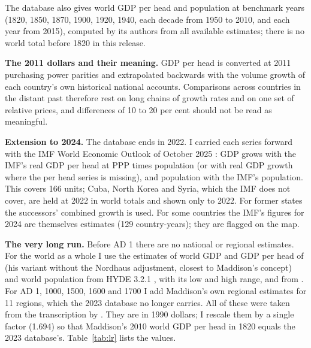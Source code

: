 \documentclass[11pt,a4paper]{article}
\begin{document}
The database also gives world GDP per head and population at benchmark years (1820, 1850, 1870, 1900, 1920, 1940, each decade from 1950 to 2010, and each year from 2015), computed by its authors from all available estimates; there is no world total before 1820 in this release.

\textbf{The 2011 dollars and their meaning.} GDP per head is converted at 2011 purchasing power parities and extrapolated backwards with the volume growth of each country's own historical national accounts. Comparisons across countries in the distant past therefore rest on long chains of growth rates and on one set of relative prices, and differences of 10 to 20 per cent should not be read as meaningful.

\textbf{Extension to 2024.} The database ends in 2022. I carried each series forward with the IMF World Economic Outlook of October 2025 \citep{weo2025}: GDP grows with the IMF's real GDP per head at PPP times population (or with real GDP growth where the per head series is missing), and population with the IMF's population. This covers 166 units; Cuba, North Korea and Syria, which the IMF does not cover, are held at 2022 in world totals and shown only to 2022. For former states the successors' combined growth is used. For some countries the IMF's figures for 2024 are themselves estimates (129 country-years); they are flagged on the map.

\textbf{The very long run.} Before AD 1 there are no national or regional estimates. For the world as a whole I use the estimates of world GDP and GDP per head of \citet{delong1998} (his variant without the Nordhaus adjustment, closest to Maddison's concept) and world population from HYDE 3.2.1 \citep{hyde2017}, with its low and high range, and from \citet{mcevedy1978}. For AD 1, 1000, 1500, 1600 and 1700 I add Maddison's own regional estimates \citep{maddison2010} for 11 regions, which the 2023 database no longer carries. All of these were taken from the transcription by \citet{roodman2020}. They are in 1990 dollars; I rescale them by a single factor (1.694) so that Maddison's 2010 world GDP per head in 1820 equals the 2023 database's. Table~\ref{tab:lr} lists the values.
\end{document}

